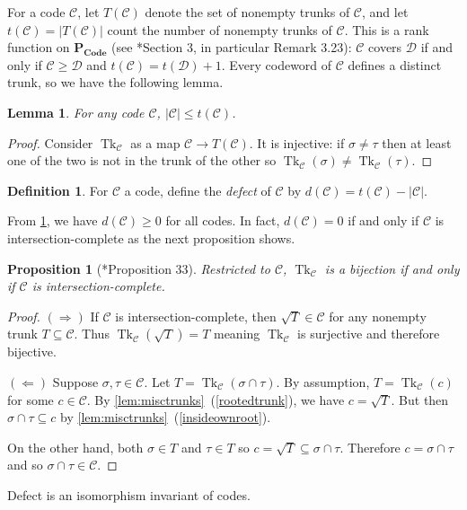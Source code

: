 \documentclass[11pt,letterpaper, reqno]{amsart}
\newtheorem{lem}[thm]{Lemma}         %
\newtheorem{prop}[thm]{Proposition}  %
\theoremstyle{definition}
\newtheorem{defn}[thm]{Definition}   %
\DeclareMathOperator{\tk}{Tk}
\def\cC{\mathcal{C}}
\def\cD{\mathcal{D}}
\def\pcode{\mathbf{P_{Code}}}
\begin{document}
        For a code $\cC$, let $T(\cC)$ denote the set of nonempty trunks of $\cC$, and let $t(\cC) = |T(\cC)|$ count the number of nonempty trunks of $\cC$.
        This is a rank function on $\pcode$ (see \cite{jeffs2019sunflowers}*{Section 3}, in particular Remark 3.23): $\cC$ covers $\cD$ if and only if $\cC \geq \cD$ and $t(\cC) = t(\cD) + 1$.
        Every codeword of $\cC$ defines a distinct trunk, so we have the following lemma.

        \begin{lem}\label{lem:trunkinjection}
            For any code $\cC$, $|\cC| \leq t(\cC)$.
        \end{lem}
        \begin{proof}
            Consider $\tk_\cC$ as a map $\cC \to T(\cC)$. It is injective: if $\sigma \neq \tau$ then at least one of the two is not in the trunk of the other so $\tk_\cC(\sigma) \neq \tk_\cC(\tau)$.
        \end{proof}


        
        \begin{defn}\label{def:defect}
            For $\cC$ a code, define the \emph{defect} of $\cC$ by $d(\cC) = t(\cC) - |\cC|$.
        \end{defn}
        From \cref{lem:trunkinjection}, we have $d(\cC) \geq 0$ for all codes.
        In fact, $d(\cC) = 0$ if and only if $\cC$ is intersection-complete as the next proposition shows.
        \begin{prop}[\cite{jeffs2025coveringrelationsposetcombinatorial}*{Proposition 33}]\label{lem:intcompletetrunks}
            Restricted to $\cC$, $\tk_\cC$ is a bijection if and only if $\cC$ is intersection-complete.
        \end{prop}
        \begin{proof}
            $(\Rightarrow)$ If $\cC$ is intersection-complete, then $\sqrt{T} \in \cC$ for any nonempty trunk $T \subseteq \cC$. 
            Thus $\tk_\cC(\sqrt{T}) = T$ meaning $\tk_\cC$ is surjective and therefore bijective.
            
            $(\Leftarrow)$ Suppose $\sigma, \tau \in \cC$. Let $T = \tk_\cC(\sigma \cap \tau)$. By assumption, $T = \tk_\cC(c)$ for some $c \in \cC$.
            By \cref{lem:misctrunks}~(\ref{rootedtrunk}), we have $c = \sqrt{T}$. But then $\sigma \cap \tau \subseteq c$ by \cref{lem:misctrunks}~(\ref{insideownroot}).
            
            On the other hand, both $\sigma \in T$ and $\tau \in T$ so $c =\sqrt{T} \subseteq \sigma \cap \tau$. Therefore $c = \sigma \cap \tau$ and so $\sigma \cap \tau \in \cC$.
        \end{proof}
        Defect is an isomorphism invariant of codes.
\end{document}
